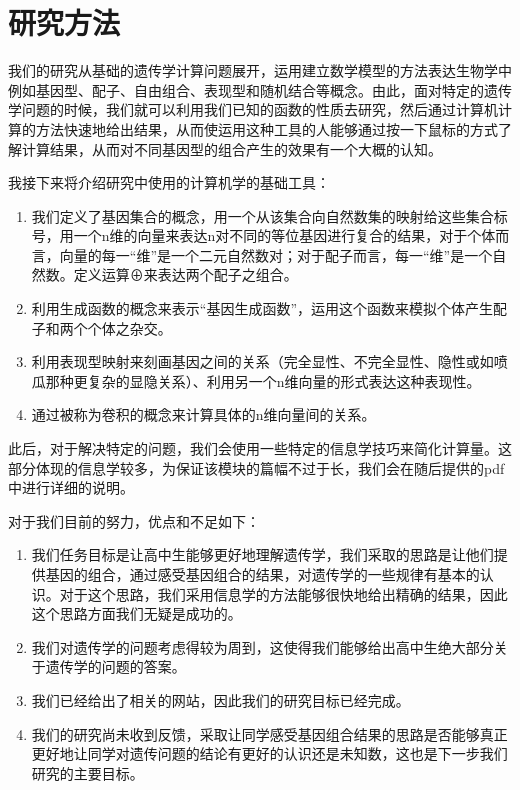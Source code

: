 \documentclass[12pt]{article} %
\begin{document}
\section{研究方法}

我们的研究从基础的遗传学计算问题展开，运用建立数学模型的方法表达生物学中例如基因型、配子、自由组合、表现型和随机结合等概念。由此，面对特定的遗传学问题的时候，我们就可以利用我们已知的函数的性质去研究，然后通过计算机计算的方法快速地给出结果，从而使运用这种工具的人能够通过按一下鼠标的方式了解计算结果，从而对不同基因型的组合产生的效果有一个大概的认知。

我接下来将介绍研究中使用的计算机学的基础工具：

\begin{enumerate}
	\item 我们定义了基因集合的概念，用一个从该集合向自然数集的映射给这些集合标号，用一个n维的向量来表达n对不同的等位基因进行复合的结果，对于个体而言，向量的每一“维”是一个二元自然数对；对于配子而言，每一“维”是一个自然数。定义运算⊕来表达两个配子之组合。
	\item 利用生成函数的概念来表示“基因生成函数”，运用这个函数来模拟个体产生配子和两个个体之杂交。
	\item 利用表现型映射来刻画基因之间的关系（完全显性、不完全显性、隐性或如喷瓜那种更复杂的显隐关系）、利用另一个n维向量的形式表达这种表现性。
	\item 通过被称为卷积的概念来计算具体的n维向量间的关系。
\end{enumerate}

此后，对于解决特定的问题，我们会使用一些特定的信息学技巧来简化计算量。这部分体现的信息学较多，为保证该模块的篇幅不过于长，我们会在随后提供的pdf中进行详细的说明。

对于我们目前的努力，优点和不足如下：

\begin{enumerate}
	\item 我们任务目标是让高中生能够更好地理解遗传学，我们采取的思路是让他们提供基因的组合，通过感受基因组合的结果，对遗传学的一些规律有基本的认识。对于这个思路，我们采用信息学的方法能够很快地给出精确的结果，因此这个思路方面我们无疑是成功的。
	\item 我们对遗传学的问题考虑得较为周到，这使得我们能够给出高中生绝大部分关于遗传学的问题的答案。
	\item 我们已经给出了相关的网站，因此我们的研究目标已经完成。
	\item 我们的研究尚未收到反馈，采取让同学感受基因组合结果的思路是否能够真正更好地让同学对遗传问题的结论有更好的认识还是未知数，这也是下一步我们研究的主要目标。
\end{enumerate}
\end{document}
